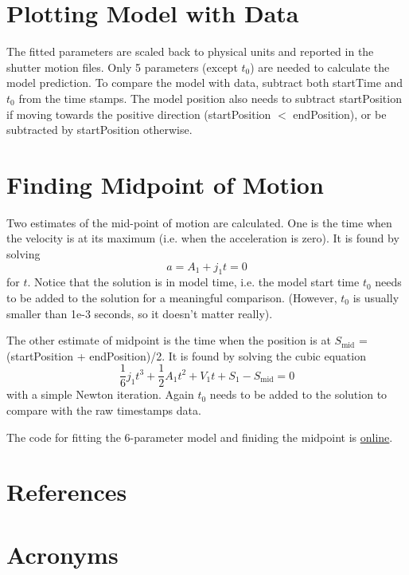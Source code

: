 \documentclass[OPS,lsstdraft,authoryear,toc]{lsstdoc}
\newcommand{\eq}[1]{\begin{equation}#1\end{equation}}
\begin{document}
\section{Plotting Model with Data}
The fitted parameters are scaled back to physical units and reported in the shutter motion files. Only 5 parameters (except $t_0$) are needed to calculate the model prediction. To compare the model with data, subtract both startTime and $t_0$ from the time stamps. The model position also needs to subtract startPosition if moving towards the positive direction (startPosition $<$ endPosition), or be subtracted by startPosition otherwise.

\section{Finding Midpoint of Motion}
Two estimates of the mid-point of motion are calculated. One is the time when the velocity is at its maximum (i.e. when the acceleration is zero). It is found by solving
\eq{
    a = A_1 + j_1 t = 0
}
for $t$. Notice that the solution is in model time, i.e. the model start time $t_0$ needs to be added to the solution for a meaningful comparison. (However, $t_0$ is usually smaller than 1e-3 seconds, so it doesn't matter really).

The other estimate of midpoint is the time when the position is at $S_{\mathrm{mid}}$ = (startPosition + endPosition)/2. It is found by solving the cubic equation
\eq{
    \frac{1}{6}j_1 t^3 + \frac{1}{2}A_1 t^2 + V_1 t + S_1 - S_{\mathrm{mid}} = 0
}
with a simple Newton iteration. Again $t_0$ needs to be added to the solution to compare with the raw timestamps data.

The code for fitting the 6-parameter model and finiding the midpoint is
\href{https://github.com/shuang92/StandaloneJavaShutterFitter/blob/main/src/main/java/org/lsst/ccs/standalone/shutter/fitter/StandaloneJavaShutterFitter.java}{online}.


\appendix
\section{References} \label{sec:bib}
\renewcommand{\refname}{} %


\section{Acronyms} \label{sec:acronyms}

\end{document}
